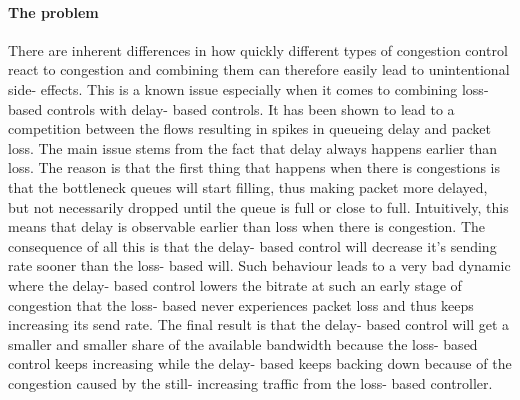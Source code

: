 \documentclass[UKenglish]{ifimaster}
\begin{document}
\paragraph{The problem}
There are inherent differences in how quickly different types of congestion control react to congestion and combining them can therefore easily lead to unintentional side- effects. 
This is a known issue especially when it comes to combining loss- based controls with delay- based controls.
It has been shown to lead to a competition between the flows resulting in spikes in queueing delay and packet loss. 
The main issue stems from the fact that delay always happens earlier than loss.
The reason is that the first thing that happens when there is congestions is that the bottleneck queues will start filling, thus making packet more delayed, but not necessarily dropped until the queue is full or close to full.
Intuitively, this means that delay is observable earlier than loss when there is congestion.
The consequence of all this is that the delay- based control will decrease it's sending rate sooner than the loss- based will. 
Such behaviour leads to a very bad dynamic where the delay- based control lowers the bitrate at such an early stage of congestion that the loss- based never experiences packet loss and thus keeps increasing its send rate. 
The final result is that the delay- based control will get a smaller and smaller share of the available bandwidth because the loss- based control keeps increasing while the delay- based keeps backing down because of the congestion caused by the still- increasing traffic from the loss- based controller.
\end{document}
